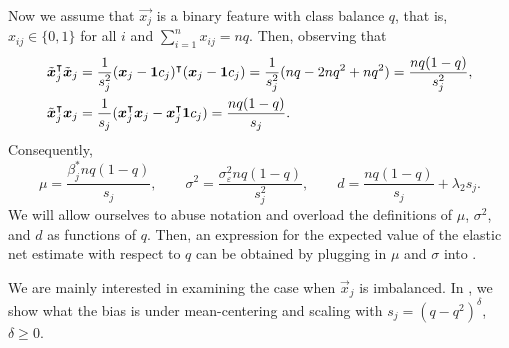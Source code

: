 Now we assume that \(\vec{x_j}\) is a binary feature with class balance \(q\), that is, \(x_{ij} \in \{0, 1\}\) for all \(i\) and \(\sum_{i=1}^n x_{ij} = nq\). Then, observing that
\[
  \begin{aligned}
    \tilde{\boldsymbol{x}}_j^\intercal \tilde{\boldsymbol{x}}_j & = \frac{1}{s_j^2}(\boldsymbol{x}_j - \boldsymbol{1} c_j)^\intercal (\boldsymbol{x}_j - \boldsymbol{1} c_j) = \frac{1}{s^2_j}(nq - 2nq^2 + nq^2) = \frac{nq(1-q)}{s^2_j}, \\
    \tilde{\boldsymbol{x}}_j^\intercal \boldsymbol{x}_j         & = \frac{1}{s_j}(\boldsymbol{x}_j^\intercal \boldsymbol{x}_j - \boldsymbol{x}_j^\intercal \boldsymbol{1} c_j) = \frac{nq(1 - q)}{s_j}.
  \end{aligned}
\]
Consequently,
\[
  \mu = \frac{\beta^*_j nq(1 - q)}{s_j}, \qquad \sigma^2 = \frac{\sigma_\varepsilon^2nq(1 - q)}{s^2_j}, \qquad d = \frac{nq(1 -q)}{s_j}  + \lambda_2 s_j.
\]
We will allow ourselves to abuse notation and overload the definitions of \(\mu\), \(\sigma^2\), and \(d\) as functions of \(q\). Then, an expression for the expected value of the elastic net estimate with respect to \(q\) can be obtained by plugging in \(\mu\) and \(\sigma\) into .

We are mainly interested in examining the case when \(\vec{x}_j\) is imbalanced. In , we show what the
bias is under mean-centering and scaling with \(s_j = (q - q^2)^\delta\), \(\delta \geq 0\).

